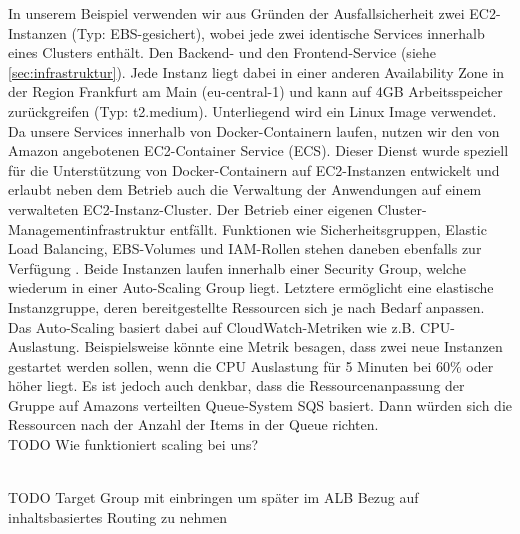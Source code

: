 In unserem Beispiel verwenden wir aus Gründen der Ausfallsicherheit zwei EC2-Instanzen (Typ: EBS-gesichert), wobei jede zwei identische Services innerhalb eines Clusters enthält. Den Backend- und den Frontend-Service (siehe \ref{sec:infrastruktur}). Jede Instanz liegt dabei in einer anderen Availability Zone in der Region Frankfurt am Main (eu-central-1) und kann auf 4GB Arbeitsspeicher zurückgreifen (Typ: t2.medium). Unterliegend wird ein Linux Image verwendet.
\\Da unsere Services innerhalb von Docker-Containern laufen, nutzen wir den von Amazon angebotenen EC2-Container Service (ECS). Dieser Dienst wurde speziell für die Unterstützung von Docker-Containern auf EC2-Instanzen entwickelt und erlaubt neben dem Betrieb auch die Verwaltung der Anwendungen auf einem verwalteten EC2-Instanz-Cluster. Der Betrieb einer eigenen Cluster-Managementinfrastruktur entfällt. Funktionen wie Sicherheitsgruppen, Elastic Load Balancing, EBS-Volumes und IAM-Rollen stehen daneben ebenfalls zur Verfügung \cite{aws:ecs}.
Beide Instanzen laufen innerhalb einer Security Group, welche wiederum in einer Auto-Scaling Group liegt. Letztere ermöglicht eine elastische Instanzgruppe, deren bereitgestellte Ressourcen sich je nach Bedarf anpassen. Das Auto-Scaling basiert dabei auf CloudWatch-Metriken wie z.B. CPU-Auslastung. Beispielsweise könnte eine Metrik besagen, dass zwei neue Instanzen gestartet werden sollen, wenn die CPU Auslastung für 5 Minuten bei 60\% oder höher liegt. Es ist jedoch auch denkbar, dass die Ressourcenanpassung der Gruppe auf Amazons verteilten Queue-System SQS basiert. Dann würden sich die Ressourcen nach der Anzahl der Items in der Queue richten. \cite{vliet:resilience} \\

TODO Wie funktioniert scaling bei uns?

\\

TODO Target Group mit einbringen um später im ALB Bezug auf inhaltsbasiertes Routing zu nehmen

